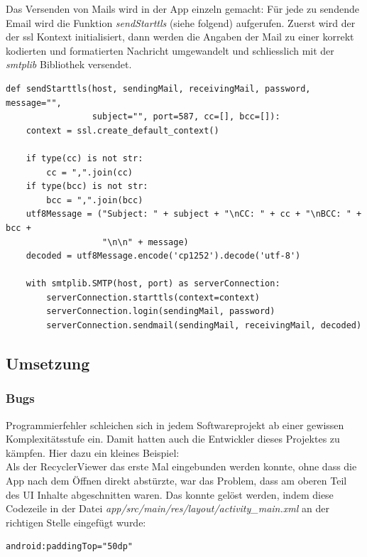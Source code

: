 \documentclass[a4paper,11pt]{article}
\begin{document}
Das Versenden von Mails wird in der App einzeln gemacht: Für jede zu sendende Email wird die Funktion \textit{sendStarttls} (siehe folgend) aufgerufen. Zuerst wird der der \gls{ssl} Kontext initialisiert, dann werden die Angaben der Mail zu einer korrekt kodierten und formatierten Nachricht umgewandelt und schliesslich mit der \textit{smtplib} Bibliothek versendet.

\lstset{language=python}
\begin{lstlisting}
def sendStarttls(host, sendingMail, receivingMail, password, message="",
                 subject="", port=587, cc=[], bcc=[]):
    context = ssl.create_default_context()

    if type(cc) is not str:
        cc = ",".join(cc)
    if type(bcc) is not str:
        bcc = ",".join(bcc)
    utf8Message = ("Subject: " + subject + "\nCC: " + cc + "\nBCC: " + bcc +
                   "\n\n" + message)
    decoded = utf8Message.encode('cp1252').decode('utf-8')

    with smtplib.SMTP(host, port) as serverConnection:
        serverConnection.starttls(context=context)
        serverConnection.login(sendingMail, password)
        serverConnection.sendmail(sendingMail, receivingMail, decoded)
\end{lstlisting}

\subsection{Umsetzung}
\subsubsection{Bugs}
Programmierfehler schleichen sich in jedem Softwareprojekt ab einer gewissen Komplexitätsstufe ein. Damit hatten auch die Entwickler dieses Projektes zu kämpfen. Hier dazu ein kleines Beispiel:\\

Als der RecyclerViewer das erste Mal eingebunden werden konnte, ohne dass die App nach dem Öffnen direkt abstürzte, war das Problem, dass am oberen Teil des UI Inhalte abgeschnitten waren. Das konnte gelöst werden, indem diese Codezeile in der Datei \textit{app/src/main/res/layout/activity\_main.xml} an der richtigen Stelle eingefügt wurde:

\lstset{language=XML}
\begin{lstlisting}
android:paddingTop="50dp"
\end{lstlisting}
\end{document}
